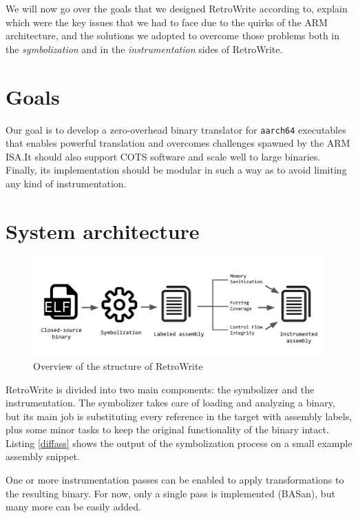 \documentclass[a4paper,11pt,oneside]{report}
\newcommand{\sysname}{RetroWrite\xspace}
\begin{document}
We will now go over the goals that we designed \sysname according to, explain
which were the key issues that we had to face due to the quirks of the ARM
architecture, and the solutions we adopted to overcome those problems both in
the \emph{symbolization} and in the \emph{instrumentation} sides of \sysname.


\section{Goals}

Our goal is to develop a zero-overhead binary translator for \texttt{aarch64} 
executables that enables powerful translation and overcomes challenges spawned 
by the ARM ISA.\@ It should also support COTS software and scale well to large 
binaries. Finally, its implementation should be modular in such a way as to 
avoid limiting any kind of instrumentation.


\section{System architecture}

\begin{figure}[h]
\includegraphics[width=15cm]{symbolizer.png}
\centering
\caption{Overview of the structure of \sysname}
\end{figure}

\sysname is divided into two main components: the symbolizer and the 
instrumentation.  The symbolizer takes care of loading and analyzing a binary, 
but its main job is substituting every reference in the target with assembly 
labels, plus some minor tasks to keep the original functionality of the binary 
intact. 
Listing \ref{diffass}  shows the output of the symbolization process on a
small example assembly snippet.

One or more instrumentation passes can be enabled to apply 
transformations to the resulting binary. For now, only a single pass is 
implemented (BASan), but many more can be easily added.
\end{document}
